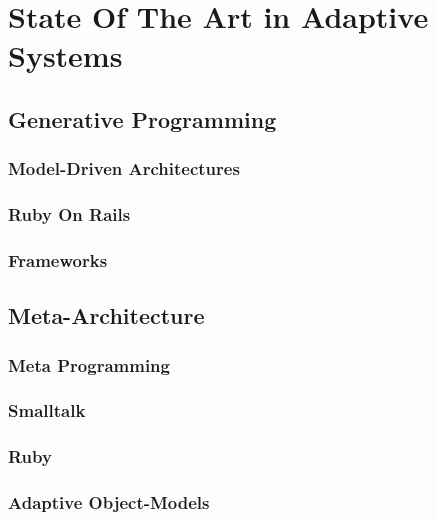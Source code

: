 \chapter{State Of The Art in Adaptive Systems}

\section{Generative Programming}

\subsection{Model-Driven Architectures}

\subsection{Ruby On Rails}

\subsection{Frameworks}


\section{Meta-Architecture}

\subsection{Meta Programming}

\subsection{Smalltalk}

\subsection{Ruby}

\subsection{Adaptive Object-Models}

